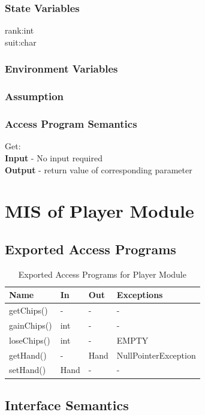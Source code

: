 \documentclass[11pt]{article}
\begin{document}
    \subsubsection{State Variables}
    rank:int\\
    suit:char
    \subsubsection{Environment Variables}
    \subsubsection{Assumption}
    \subsubsection{Access Program Semantics}
    Get: \\
    \textbf{Input} - No input required\\
    \textbf{Output} - return value of corresponding parameter\\
 	\newline
 	\section{MIS of Player Module}
     
    \subsection{Exported Access Programs}
    \begin{table}[h]
    \caption{Exported Access Programs for Player Module}
    \begin{tabular}{p{4cm}p{2cm}p{2cm}p{4cm}}
    Name & In & Out & Exceptions\\
    \hline
    getChips() & - & - & -\\
    \hline
    gainChips() & int & - & -\\
	\hline    
    loseChips() & int & - & EMPTY\\
	\hline    	
    getHand() & - & Hand & NullPointerException \\
	\hline    
    setHand()& Hand & - & -\\
    \hline
    \end{tabular}
    \end{table}
    \subsection{Interface Semantics}
\end{document}
